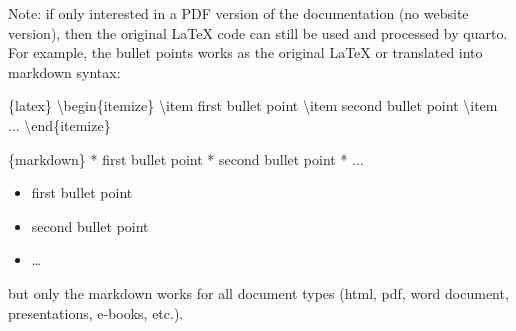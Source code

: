 \documentclass[
  letterpaper,
  oneside,
  openany]{scrbook}
\newenvironment{Shaded}{\begin{snugshade}}{\end{snugshade}}
\newcommand{\InformationTok}[1]{\textcolor[rgb]{0.37,0.37,0.37}{#1}}
\newcommand{\NormalTok}[1]{\textcolor[rgb]{0.00,0.23,0.31}{#1}}
\newcommand{\SpecialStringTok}[1]{\textcolor[rgb]{0.13,0.47,0.30}{#1}}
\providecommand{\tightlist}{%
  \setlength{\itemsep}{0pt}\setlength{\parskip}{0pt}}
\begin{document}
\begin{tcolorbox}[enhanced jigsaw, arc=.35mm, bottomrule=.15mm, bottomtitle=1mm, breakable, colback=white, colbacktitle=quarto-callout-note-color!10!white, colframe=quarto-callout-note-color-frame, coltitle=black, left=2mm, leftrule=.75mm, opacityback=0, opacitybacktitle=0.6, rightrule=.15mm, title=\textcolor{quarto-callout-note-color}{\faInfo}\hspace{0.5em}{Note}, titlerule=0mm, toprule=.15mm, toptitle=1mm]

Note: if only interested in a PDF version of the documentation (no
website version), then the original LaTeX code can still be used and
processed by quarto. For example, the bullet points works as the
original LaTeX or translated into markdown syntax:

\begin{Shaded}
\begin{Highlighting}[]
\InformationTok{\textasciigrave{}\textasciigrave{}\textasciigrave{}\{latex\}}
\InformationTok{\textbackslash{}begin\{itemize\}}
\InformationTok{    \textbackslash{}item first bullet point}
\InformationTok{    \textbackslash{}item second bullet point}
\InformationTok{    \textbackslash{}item ...}
\InformationTok{\textbackslash{}end\{itemize\}}
\InformationTok{\textasciigrave{}\textasciigrave{}\textasciigrave{}}
\end{Highlighting}
\end{Shaded}

\begin{Shaded}
\begin{Highlighting}[]
\InformationTok{\textasciigrave{}\textasciigrave{}\textasciigrave{}\{markdown\}}
\SpecialStringTok{* }\NormalTok{first bullet point}
\SpecialStringTok{* }\NormalTok{second bullet point}
\SpecialStringTok{* }\NormalTok{...}
\InformationTok{\textasciigrave{}\textasciigrave{}\textasciigrave{}}
\end{Highlighting}
\end{Shaded}

\begin{itemize}
\tightlist
\item
  first bullet point
\item
  second bullet point
\item
  \ldots{}
\end{itemize}

but only the markdown works for all document types (html, pdf, word
document, presentations, e-books, etc.).

\end{tcolorbox}
\end{document}
